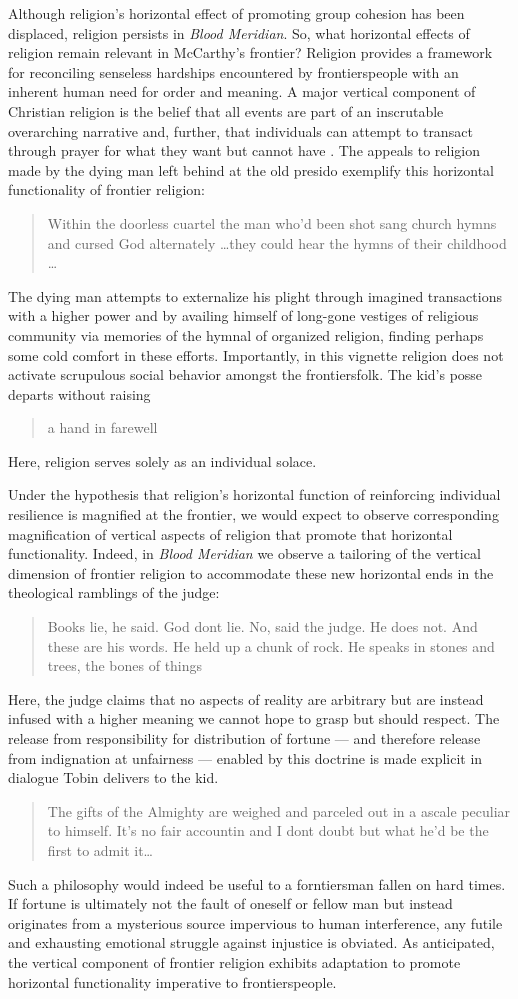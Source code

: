 Although religion's horizontal effect of promoting group cohesion has been displaced, religion persists in \textit{Blood Meridian}.
So, what horizontal effects of religion remain relevant in McCarthy's frontier?
Religion provides a framework for reconciling senseless hardships encountered by frontierspeople with an inherent human need for order and meaning.
A major vertical component of Christian religion is the belief that all events are part of an inscrutable overarching narrative and, further, that individuals can attempt to transact through prayer for what they want but cannot have \cite[p 240]{Wilson2007EvolutionLives}.
The appeals to religion made by the dying man left behind at the old presido exemplify this horizontal functionality of frontier religion:
\blockcquote[p 119]{McCarthy1992BloodWest}{
Within the doorless cuartel the man who'd been shot sang church hymns and cursed God alternately \ldots they could hear the hymns of their childhood \ldots
}.
The dying man attempts to externalize his plight through imagined transactions with a higher power and by availing himself of long-gone vestiges of religious community via memories of the hymnal of organized religion, finding perhaps some cold comfort in these efforts.
Importantly, in this vignette religion does not activate scrupulous social behavior amongst the frontiersfolk.
The kid's posse departs without raising \blockcquote[p 119]{McCarthy1992BloodWest}{
a hand in farewell
}.
Here, religion serves solely as an individual solace.

Under the hypothesis that religion's horizontal function of reinforcing individual resilience is magnified at the frontier, we would expect to observe corresponding magnification of vertical aspects of religion that promote that horizontal functionality.
Indeed, in \textit{Blood Meridian} we observe a tailoring of the vertical dimension of frontier religion to accommodate these new horizontal ends in the theological ramblings of the judge:
\blockcquote[p 116]{McCarthy1992BloodWest}{
Books lie, he said.
God dont lie.
No, said the judge.
He does not.
And these are his words.
He held up a chunk of rock.
He speaks in stones and trees, the bones of things
}.
Here, the judge claims that no aspects of reality are arbitrary but are instead infused with a higher meaning we cannot hope to grasp but should respect.
The release from responsibility for distribution of fortune --- and therefore release from indignation at unfairness --- enabled by this doctrine is made explicit in dialogue Tobin delivers to the kid.
\blockcquote[p 123]{McCarthy1992BloodWest}{
The gifts of the Almighty are weighed and parceled out in a ascale peculiar to himself.
It's no fair accountin and I dont doubt but what he'd be the first to admit it\ldots
}.
Such a philosophy would indeed be useful to a forntiersman fallen on hard times.
If fortune is ultimately not the fault of oneself or fellow man but instead originates from a mysterious source impervious to human interference, any futile and exhausting emotional struggle against injustice is obviated.
As anticipated, the vertical component of frontier religion exhibits adaptation to promote horizontal functionality imperative to frontierspeople.
